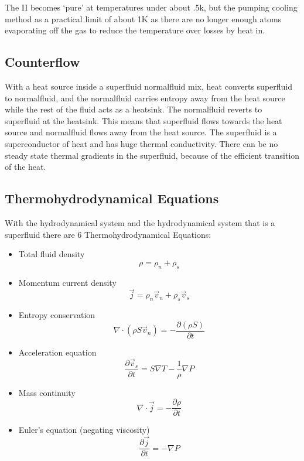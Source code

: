 The \he II becomes `pure’ at temperatures under about .5k, but the pumping cooling method
as a practical limit of about 1K as there are no longer enough atoms evaporating off the
gas to reduce the temperature over losses by heat in.

\subsection{Counterflow}
With a heat source inside a superfluid normalfluid mix,
heat converts superfluid to normalfluid, and the normalfluid carries entropy
away from the heat source while the rest of the fluid acts as a heatsink.
The normalfluid reverts to superfluid at the heatsink.
This means that superfluid flows towards the heat source and normalfluid flows away from the heat source.
The superfluid is a superconductor of heat and has huge thermal conductivity. 
There can be no steady state thermal gradients in the superfluid, because of the efficient transition of the heat.

\subsection{Thermohydrodynamical Equations}
With the hydrodynamical system and the hydrodynamical system that is a superfluid
there are 6 Thermohydrodynamical Equations:

\begin{itemize}
\item Total fluid density \begin{equation}\rho = \rho_n + \rho_s\end{equation}
\item Momentum current density \begin{equation}\vec{j} = \rho_n\vec{v}_n + \rho_s\vec{v}_s\end{equation}
\item Entropy conservation \begin{equation}\nabla \cdot \left( \rho S \vec{v}_n \right) = - \frac{\partial \left( \rho S \right)}{ \partial t}\end{equation}
\item Acceleration equation \begin{equation}\frac{\partial \vec{v}_s}{\partial t} = S \nabla T - \frac{1}{\rho} \nabla P\end{equation}
\item Mass continuity \begin{equation}\nabla \cdot \vec{j} = - \frac{\partial \rho}{\partial t}\end{equation}
\item Euler’s equation (negating viscosity) \begin{equation} \frac{\partial \vec{j}}{\partial t} = - \nabla P\end{equation}
\end{itemize}


